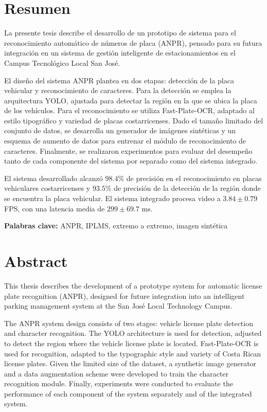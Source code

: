 \chapter*{Resumen}
\thispagestyle{empty}

La presente tesis describe el desarrollo de un prototipo
de sistema para el reconocimiento automático de números de placa (ANPR),
pensado para su futura integración en un sistema de gestión inteligente de estacionamientos
en el Campus Tecnológico Local San José.

El diseño del sistema ANPR plantea en dos etapas:
detección de la placa vehicular y reconocimiento de caracteres.
Para la detección se emplea la arquitectura YOLO, 
ajustada para detectar la región en la que se ubica la placa de los vehículos.
Para el reconocimiento se utiliza Fast-Plate-OCR,
adaptado al estilo tipográfico y variedad de placas costarricenses.
Dado el tamaño limitado del conjunto de datos, se desarrolla un generador
de imágenes sintéticas y un esquema de aumento de datos 
para entrenar el módulo de reconocimiento de caracteres.
Finalmente, se realizaron experimentos para evaluar del desempeño tanto de cada componente del
sistema por separado como del sistema integrado.

El sistema desarrollado alcanzó $98.4\%$ de precisión en el 
reconocimiento en placas vehiculares costarricenses
y $93.5\%$ de precisión de la detección de la región donde 
se encuentra la placa vehicular.
El sistema integrado procesa video a $3.84\pm 0.79$ FPS,
con una latencia media de $299\pm 69.7$ ms.

\bigskip

\textbf{Palabras clave:} ANPR, IPLMS, extremo a extremo, imagen sintética \thesisKeywords

\clearpage
\chapter*{Abstract}
\thispagestyle{empty}

This thesis describes the development of a prototype system for automatic license plate recognition (ANPR),
designed for future integration into an intelligent parking management system 
at the San José Local Technology Campus.

The ANPR system design consists of two stages: vehicle license plate detection and character recognition.
The YOLO architecture is used for detection, adjusted to detect the region where the vehicle license plate is located.
Fast-Plate-OCR is used for recognition, adapted to the typographic style and variety of Costa Rican license plates.
Given the limited size of the dataset, a synthetic image generator and a data augmentation scheme 
were developed to train the character recognition module.
Finally, experiments were conducted to evaluate the performance of each component of the system separately 
and of the integrated system.

